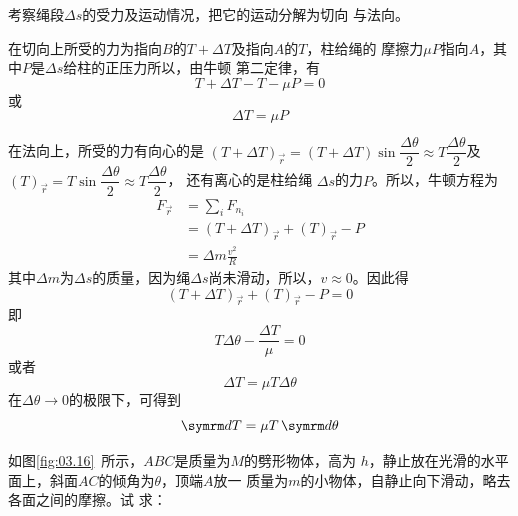 \solution 考察绳段$ \Delta s $的受力及运动情况，把它的运动分解为切向
与法向。

在切向上所受的力为指向$ B $的$ T+\Delta T $及指向$ A $的$ T $，柱给绳的
摩擦力$ \mu P $指向$ A $，其中$ P $是$ \Delta s $给柱的正压力所以，由牛顿
第二定律，有
\begin{equation*}
  T + \Delta T - T - \mu P = 0
\end{equation*}
或\vspace{-1.8em}
\begin{equation*}
  \Delta T = \mu P
\end{equation*}

在法向上，所受的力有向心的是
$\left( T + \Delta T \right) _ \vec{r} = \left( T + \Delta T \right) \sin \dfrac{ \Delta \theta }{ 2 } \approx T \dfrac { \Delta \theta }{2}$及$ \left(T\right)_{\vec{r}} = T \sin \dfrac { \Delta \theta } { 2 } \approx T \dfrac { \Delta \theta } { 2 }$，
还有离心的是柱给绳
$ \Delta s $的力$ P $。所以，牛顿方程为
\begin{align*}
  F _ { \vec{r} } & = \sum _ i  F _ { n _ { i } }                                            \\
                  & = \left( T + \Delta T \right)_{\vec{r}} + \left( T \right)_{\vec{r}} - P \\
                  & = \Delta m \frac { v ^ { 2 } } { R }
\end{align*}
其中$ \Delta m $为$ \Delta s $的质量，因为绳$ \Delta s $尚未滑动，所以，$  v \approx 0 $。因此得\vspace{-1.56em}
\begin{equation*}
  \left( T + \Delta T \right) _{\vec{ r }} + \left( T \right) _{\vec{ r }} - P = 0
\end{equation*}
即\vspace{-1.8em}
\begin{equation*}
  T \Delta \theta - \frac { \Delta T } { \mu } = 0
\end{equation*}
或者\vspace{-1.8em}
\begin{equation*}
  \Delta T = \mu T \Delta \theta
\end{equation*}
在$ \Delta \theta \rightarrow 0 $的极限下，可得到
\begin{equation*}
  \dif T = \mu T \dif \theta
\end{equation*}

\example 如图\ref{fig:03.16}~所示，$ ABC $是质量为$ M $的劈形物体，高为
$ h $，静止放在光滑的水平面上，斜面$ AC $的倾角为$\theta $，顶端$ A $放一
质量为$ m $的小物体，自静止向下滑动，略去各面之间的摩擦。试
求：

